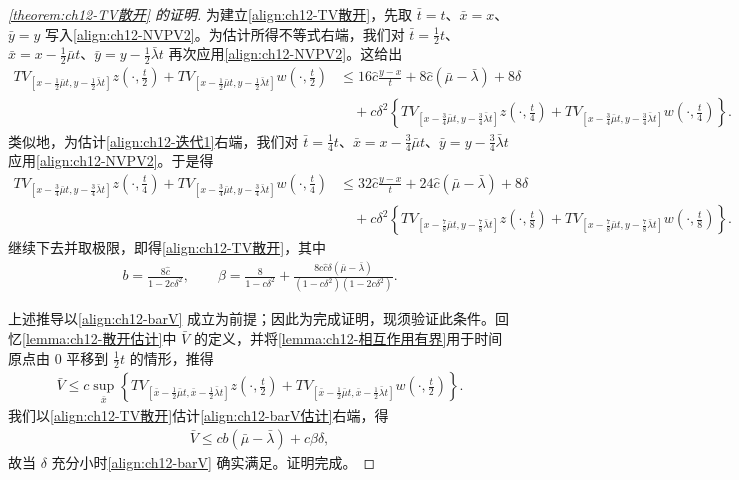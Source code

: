 \documentclass[../../main.tex]{subfiles}
\begin{document}
\begin{proof}[\cref{theorem:ch12-TV散开} 的证明]
为建立\eqref{align:ch12-TV散开}，先取 $\bar t=t$、$\bar x=x$、$\bar y=y$ 写入\eqref{align:ch12-NVPV2}。为估计所得不等式右端，我们对 $\bar t=\frac12t$、$\bar x=x-\frac12\bar\mu t$、$\bar y=y-\frac12\bar\lambda t$ 再次应用\eqref{align:ch12-NVPV2}。这给出
\begin{align}
TV_{[x-\frac12\bar\mu t,y-\frac12\bar\lambda t]}z\left(\cdot,\frac{t}{2}\right)+TV_{[x-\frac12\bar\mu t,y-\frac12\bar\lambda t]}w\left(\cdot,\frac{t}{2}\right)
&\leqslant 16\hat c\frac{y-x}{t}+8\hat c(\bar\mu-\bar\lambda)+8\delta\nonumber\\
&\quad+c\delta^2\left\{TV_{[x-\frac34\bar\mu t,y-\frac34\bar\lambda t]}z\left(\cdot,\frac{t}{4}\right)+TV_{[x-\frac34\bar\mu t,y-\frac34\bar\lambda t]}w\left(\cdot,\frac{t}{4}\right)\right\}.
\label{align:ch12-迭代1}
\end{align}
类似地，为估计\eqref{align:ch12-迭代1}右端，我们对 $\bar t=\frac14t$、$\bar x=x-\frac34\bar\mu t$、$\bar y=y-\frac34\bar\lambda t$ 应用\eqref{align:ch12-NVPV2}。于是得
\begin{align}
TV_{[x-\frac34\bar\mu t,y-\frac34\bar\lambda t]}z\left(\cdot,\frac{t}{4}\right)+TV_{[x-\frac34\bar\mu t,y-\frac34\bar\lambda t]}w\left(\cdot,\frac{t}{4}\right)
&\leqslant 32\hat c\frac{y-x}{t}+24\hat c(\bar\mu-\bar\lambda)+8\delta\nonumber\\
&\quad+c\delta^2\left\{TV_{[x-\frac78\bar\mu t,y-\frac78\bar\lambda t]}z\left(\cdot,\frac{t}{8}\right)+TV_{[x-\frac78\bar\mu t,y-\frac78\bar\lambda t]}w\left(\cdot,\frac{t}{8}\right)\right\}.
\label{align:ch12-迭代2}
\end{align}
继续下去并取极限，即得\eqref{align:ch12-TV散开}，其中
\begin{align}
b=\frac{8\hat c}{1-2c\delta^2},\qquad \beta=\frac{8}{1-c\delta^2}+\frac{8c\hat c\delta(\bar\mu-\bar\lambda)}{(1-c\delta^2)(1-2c\delta^2)}.
\label{align:ch12-bbeta}
\end{align}

上述推导以\eqref{align:ch12-barV} 成立为前提；因此为完成证明，现须验证此条件。回忆\cref{lemma:ch12-散开估计}中 $\bar V$ 的定义，并将\cref{lemma:ch12-相互作用有界}用于时间原点由 $0$ 平移到 $\frac12t$ 的情形，推得
\begin{align}
\bar V\leqslant c\sup_{\bar x}\left\{TV_{[\bar x-\frac12\bar\mu t,\bar x-\frac12\bar\lambda t]}z\left(\cdot,\frac{t}{2}\right)+TV_{[\bar x-\frac12\bar\mu t,\bar x-\frac12\bar\lambda t]}w\left(\cdot,\frac{t}{2}\right)\right\}.
\label{align:ch12-barV估计}
\end{align}
我们以\eqref{align:ch12-TV散开}估计\eqref{align:ch12-barV估计}右端，得
\begin{align}
\bar V\leqslant cb(\bar\mu-\bar\lambda)+c\beta\delta,
\label{align:ch12-barV终}
\end{align}
故当 $\delta$ 充分小时\eqref{align:ch12-barV} 确实满足。证明完成。
\end{proof}
\end{document}
